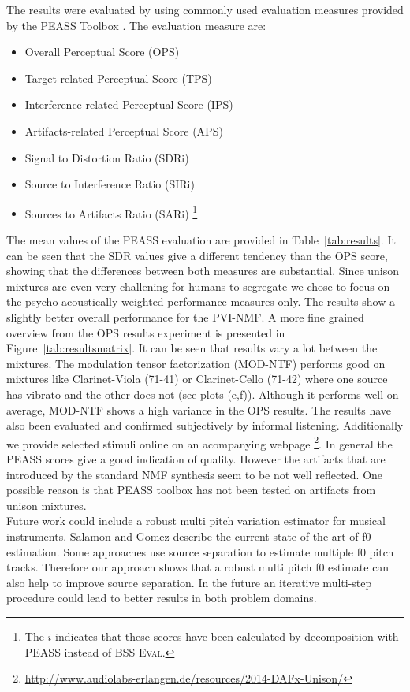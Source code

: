The results were evaluated by using commonly used evaluation measures provided by the PEASS Toolbox \cite{emiya11}. The evaluation measure are:

\begin{itemize}
  \item Overall Perceptual Score (OPS)
  \item Target-related Perceptual Score (TPS)
  \item Interference-related Perceptual Score (IPS)
  \item Artifacts-related Perceptual Score (APS)
  \item Signal to Distortion Ratio (SDRi)
  \item Source to Interference Ratio (SIRi)
  \item Sources to Artifacts Ratio (SARi) \footnote{The $i$ indicates that these scores have been calculated by decomposition with PEASS \cite{emiya11} instead of \textsc{BSS Eval}.}
\end{itemize}

The mean values of the PEASS evaluation are provided in Table~\ref{tab:results}. It can be seen that the SDR values give a different tendency than the OPS score, showing that the differences between both measures are substantial. Since unison mixtures are even very challening for humans to segregate we chose to focus on the psycho-acoustically weighted performance measures only. The results show a slightly better overall performance for the PVI-NMF. A more fine grained overview from the OPS results experiment is presented in Figure~\ref{tab:resultsmatrix}. It can be seen that results vary a lot between the mixtures. The modulation tensor factorization (MOD-NTF) performs good on mixtures like Clarinet-Viola (71-41) or Clarinet-Cello (71-42)  where one source has vibrato and the other does not (see plots (e,f)). Although it performs well on average, MOD-NTF shows a high variance in the OPS results. The results have also been evaluated and confirmed subjectively by informal listening. Additionally we provide selected stimuli online on an acompanying webpage \footnote{\url{http://www.audiolabs-erlangen.de/resources/2014-DAFx-Unison/}}. In general the PEASS scores give a good indication of quality. However the artifacts that are introduced by the standard NMF synthesis seem to be not well reflected. One possible reason is that PEASS toolbox has not been tested on artifacts from unison mixtures. \\
Future work could include a robust multi pitch variation estimator for musical instruments. Salamon and Gomez \cite{salamon12} describe the current state of the art of f0 estimation. Some approaches use source separation to estimate multiple f0 pitch tracks. Therefore our approach shows that a robust multi pitch f0 estimate can also help to improve source separation. In the future an iterative multi-step procedure could lead to better results in both problem domains.

